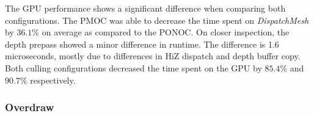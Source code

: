 \noindent
The \ac{GPU} performance shows a significant difference when comparing both configurations. The \ac{PMOC} 
was able to decrease the time spent on \emph{DispatchMesh} by $36.1\%$ on average as compared to the 
\ac{PONOC}. On closer inspection, the depth prepass showed a minor difference in runtime. The difference 
is 1.6 microseconds, mostly due to differences in \ac{HiZ} dispatch and depth buffer copy. \\

\noindent
Both culling configurations decreased the time spent on the \ac{GPU} by $85.4\%$ and $90.7\%$ respectively.

\subsubsection*{Overdraw} \label{subsubsec-overdraw-bunny}

